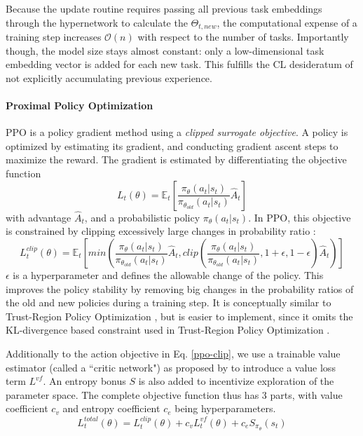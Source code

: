 \documentclass[dvipsnames]{article} %
\newcommand{\commentOLD}[1]{}
\newcommand{\asOLD}[1] {\commentOLD{{\color{orange} AS: #1}}}              %
\begin{document}
Because the update routine requires passing all previous task embeddings through the hypernetwork to calculate the $\Theta_{t,new}$, the computational expense of a training step increases $\mathcal{O}(n)$ with respect to the number of tasks. Importantly though, the model size stays almost constant: only a low-dimensional task embedding vector is added for each new task. This fulfills the CL desideratum of not explicitly accumulating previous experience.

\paragraph{Proximal Policy Optimization}
PPO is a policy gradient method using a \textit{clipped surrogate objective}. A policy is optimized by estimating its gradient, and conducting gradient ascent steps to maximize the reward. The gradient is estimated by differentiating the objective function
\begin{equation}
    L_t(\theta) = \mathbb{E}_t\left[\frac{\pi_\theta(a_t|s_t)}{\pi_{\theta_{old}}(a_t|s_t)}\hat{A}_t\right]
\end{equation}
with advantage $\hat{A}_t$, and a probabilistic policy $\pi_{\theta}(a_t|s_t)$. In PPO, this objective is constrained by clipping excessively large changes in probability ratio \citep{ppo}:
\begin{equation}
\label{ppo-clip}
    L^{clip}_t(\theta)  = \mathbb{E}_t \left[min\left(\frac{\pi_\theta(a_t|s_t)}{\pi_{\theta_{old}}(a_t|s_t)}\hat{A}_t, clip\left(\frac{\pi_\theta(a_t|s_t)}{\pi_{\theta_{old}}(a_t|s_t)}, 1+\epsilon,1-\epsilon \right)\hat{A}_t\right)\right] 
\end{equation}
$\epsilon$ is a hyperparameter and defines the allowable change of the policy. 
This improves the policy stability by removing big changes in the probability ratios of the old and new policies during a training step. It is conceptually similar to Trust-Region Policy Optimization \citep{trpo}, but is easier to implement, since it omits the KL-divergence based constraint used in Trust-Region Policy Optimization \asOLD{I think you are abusing the use of acronyms, if you plan to use them less than 5 times, do not use the acronym}. 

Additionally to the action objective in Eq. \ref{ppo-clip}, we use a trainable value estimator (called a ``critic network") as proposed by \citet{gae} to introduce a value loss term $L^{vf}$. An entropy bonus $S$ is also added to incentivize exploration of the parameter space. The complete objective function thus has 3 parts, with value coefficient $c_v$ and entropy coefficient $c_e$ being hyperparameters.
\begin{equation}
\label{ppo-actorcritic}
    L^{total}_t(\theta) = L^{clip}_t(\theta)+ c_vL^{vf}_t(\theta)+c_eS_{\pi_\theta}(s_t)
\end{equation}
\end{document}
